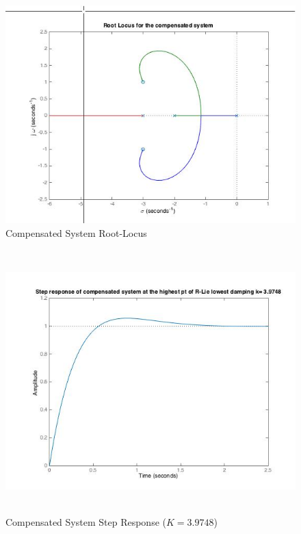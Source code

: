 \documentclass[12pt]{article}
\begin{document}
\begin{figure}[h!] %
   \centering
   \includegraphics[width=5in]{compensated_root_locus.jpg} 
   \caption{Compensated System Root-Locus}
   \label{fig:example}
\end{figure}

\newpage

\begin{figure}[h!] %
   \centering
   \includegraphics[width=5.5in,height=4in]{compensated_sys_highest_rl_time_resp.jpg} 
   \caption{Compensated System Step Response ($K=3.9748$)}
   \label{fig:example}
\end{figure}
\end{document}
